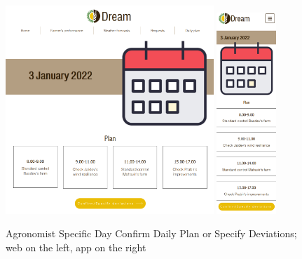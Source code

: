 \documentclass{article}
\begin{document}
        \begin{figure} [h]
            \centering
            \includegraphics[width=0.7\textwidth]{images/UserInterfaces/Agronomist/DailyPlan/SpecificDayConfirmDeviationsWeb.png}
            \quad
            \includegraphics[width=0.2\textwidth]{images/UserInterfaces/Agronomist/DailyPlan/SpecificDayConfirmDeviationsApp.png}
            \quad
            \caption{\label{fig:agronomistDPConfirmDeviationsSpecific}Agronomist Specific Day Confirm Daily Plan or Specify Deviations; web on the left, app on the right}
        \end{figure}
        \newpage
\end{document}
